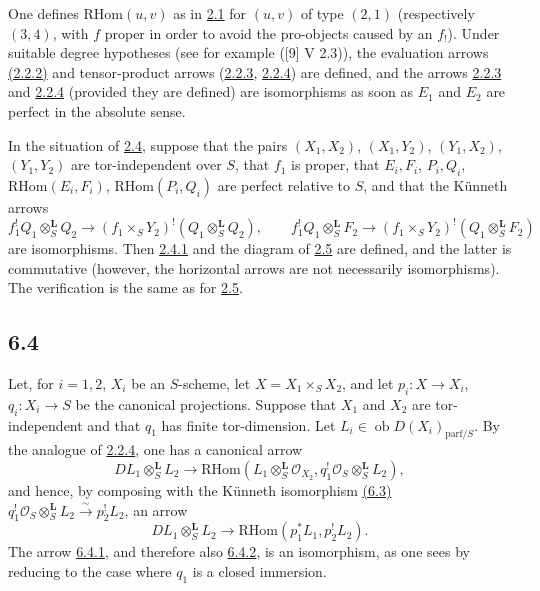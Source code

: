 \documentclass[11pt]{article}
\providecommand{\cO}{\mathcal{O}}
\providecommand{\RHom}{\mathrm{RHom}}
\providecommand{\RHom}{\mathrm{RHom}}
\providecommand{\RHom}{\mathrm R\mathcal{H}om}
\providecommand{\RHom}{\mathrm{RHom}}
\begin{document}
One defines $\RHom(u,v)$ as in \hyperref[sga5:III:subsection:2.1]{2.1} for $(u,v)$ of type $(2,1)$ (respectively $(3,4)$, with $f$ proper in order to avoid the pro-objects caused by an $f_!$). Under suitable degree hypotheses (see for example ([9] V 2.3)), the evaluation arrows \hyperref[sga5:III:equation:2.2.2]{(2.2.2)} and tensor-product arrows (\hyperref[sga5:III:equation:2.2.3]{2.2.3}, \hyperref[sga5:III:equation:2.2.4]{2.2.4}) are defined, and the arrows \hyperref[sga5:III:equation:2.2.3]{2.2.3} and \hyperref[sga5:III:equation:2.2.4]{2.2.4} (provided they are defined) are isomorphisms as soon as $E_1$ and $E_2$ are perfect in the absolute sense.

In the situation of \hyperref[sga5:III:subsection:2.4]{2.4}, suppose that the pairs $(X_1,X_2)$, $(X_1,Y_2)$, $(Y_1,X_2)$, $(Y_1,Y_2)$ are tor-independent over $S$, that $f_1$ is proper, that $E_i,F_i$, $P_i,Q_i$, $\RHom(E_i,F_i)$, $\RHom(P_i,Q_i)$ are perfect relative to $S$, and that the Künneth arrows
\[
f_1^!Q_1\otimes_S^{\mathbf L}Q_2\to(f_1\times_SY_2)^!(Q_1\otimes_S^{\mathbf L}Q_2),\qquad
f_1^!Q_1\otimes_S^{\mathbf L}F_2\to(f_1\times_SY_2)^!(Q_1\otimes_S^{\mathbf L}F_2)
\]
are isomorphisms. Then \hyperref[sga5:III:equation:2.4.1]{2.4.1} and the diagram of \hyperref[sga5:III:proposition:2.5]{2.5} are defined, and the latter is commutative (however, the horizontal arrows are not necessarily isomorphisms). The verification is the same as for \hyperref[sga5:III:proposition:2.5]{2.5}.

\subsection*{6.4}\label{sga5:III:subsection:6.4}
Let, for $i=1,2$, $X_i$ be an $S$-scheme, let $X=X_1\times_SX_2$, and let $p_i:X\to X_i$, $q_i:X_i\to S$ be the canonical projections. Suppose that $X_1$ and $X_2$ are tor-independent and that $q_1$ has finite tor-dimension. Let $L_i\in\operatorname{ob}D(X_i)_{\mathrm{parf}/S}$. By the analogue of \hyperref[sga5:III:equation:2.2.4]{2.2.4}, one has a canonical arrow
\begin{equation}
\tag{6.4.1}\label{sga5:III:equation:6.4.1}
DL_1\otimes_S^{\mathbf L}L_2\longrightarrow \RHom(L_1\otimes_S^{\mathbf L}\cO_{X_2},q_1^!\cO_S\otimes_S^{\mathbf L}L_2),
\end{equation}
and hence, by composing with the Künneth isomorphism \hyperref[sga5:III:subsection:6.3]{(6.3)} $q_1^!\cO_S\otimes_S^{\mathbf L}L_2\xrightarrow{\sim}p_2^!L_2$, an arrow
\begin{equation}
\tag{6.4.2}\label{sga5:III:equation:6.4.2}
DL_1\otimes_S^{\mathbf L}L_2\longrightarrow\RHom(p_1^*L_1,p_2^!L_2).
\end{equation}
The arrow \hyperref[sga5:III:equation:6.4.1]{6.4.1}, and therefore also \hyperref[sga5:III:equation:6.4.2]{6.4.2}, is an isomorphism, as one sees by reducing to the case where $q_1$ is a closed immersion.
\end{document}
